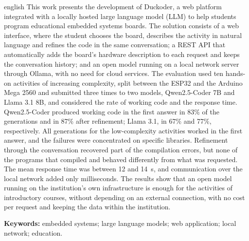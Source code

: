 
\begin{resumo}[Abstract]
  \begin{otherlanguage*}{english}
    This work presents the development of Duckoder, a web platform integrated with a locally hosted large language model (LLM) to help students program educational embedded systems boards. The solution consists of a web interface, where the student chooses the board, describes the activity in natural language and refines the code in the same conversation; a REST API that automatically adds the board's hardware description to each request and keeps the conversation history; and an open model running on a local network server through Ollama, with no need for cloud services. The evaluation used ten hands-on activities of increasing complexity, split between the ESP32 and the Arduino Mega 2560 and submitted three times to two models, Qwen2.5-Coder 7B and Llama 3.1 8B, and considered the rate of working code and the response time. Qwen2.5-Coder produced working code in the first answer in 83\% of the generations and in 87\% after refinement; Llama 3.1, in 67\% and 77\%, respectively. All generations for the low-complexity activities worked in the first answer, and the failures were concentrated on specific libraries. Refinement through the conversation recovered part of the compilation errors, but none of the programs that compiled and behaved differently from what was requested. The mean response time was between 12 and 14~s, and communication over the local network added only milliseconds. The results show that an open model running on the institution's own infrastructure is enough for the activities of introductory courses, without depending on an external connection, with no cost per request and keeping the data within the institution.

    \vspace{\onelineskip}

    \noindent\textbf{Keywords:} embedded systems; large language models; web application; local network; education.
  \end{otherlanguage*}
\end{resumo}
